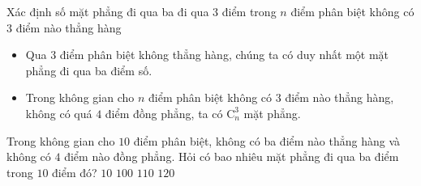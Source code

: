 \begin{dang}{Xác định số mặt phẳng đi qua ba đi qua $ 3 $ điểm trong $ n  $ điểm phân biệt không có $ 3 $ điểm nào thẳng hàng}
	\begin{itemize}
		\item Qua $ 3$ điểm phân biệt không thẳng hàng, chúng ta có duy nhất một mặt phẳng đi qua ba điểm số.
		\item Trong không gian cho $ n $ điểm phân biệt không có $ 3  $ điểm nào thẳng hàng, không có quá $ 4 $ điểm đồng phẳng, ta có $ \mathrm{C}^3_n $ mặt phẳng.
	\end{itemize}
\end{dang}
\begin{vd}%
	Trong không gian cho $ 10$ điểm phân biệt, không có ba điểm nào thẳng hàng và không có $ 4 $ điểm nào đồng phẳng. Hỏi có bao nhiêu mặt phẳng đi qua ba điểm trong $ 10 $ điểm đó?
	\choice
	{$10$}
	{$ 100 $}
	{$ 110 $}
	{\True $ 120$}
\end{vd}

